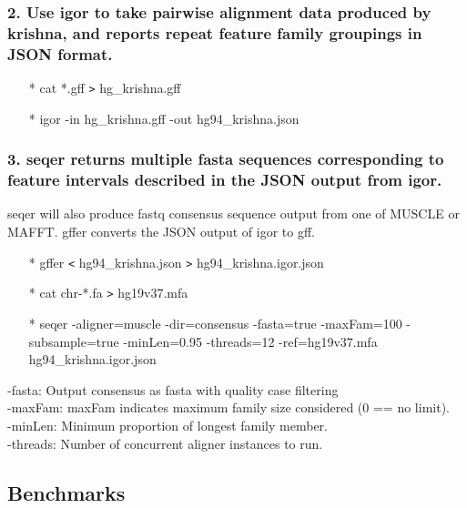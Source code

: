 \documentclass[12pt]{report}
\begin{document}
\subsubsection{2. Use igor to take pairwise alignment data produced by krishna, and reports repeat feature family groupings in JSON format.}

\begin{enumerate}
	\item[*] cat *.gff \texttt{>} hg\_krishna.gff
	\item[*] igor -in hg\_krishna.gff -out hg94\_krishna.json
\end{enumerate}

\subsubsection{3. seqer returns multiple fasta sequences corresponding to feature intervals described in the JSON output from igor.}
seqer will also produce fastq consensus sequence output from one of MUSCLE or MAFFT. gffer converts the JSON output of igor to gff.

\begin{enumerate}
	\item[*] gffer \texttt{<} hg94\_krishna.json \texttt{>} hg94\_krishna.igor.json
	\item[*] cat chr-*.fa \texttt{>} hg19v37.mfa
	\item[*] seqer -aligner=muscle -dir=consensus -fasta=true -maxFam=100 -subsample=true -minLen=0.95 -threads=12 -ref=hg19v37.mfa hg94\_krishna.igor.json
\end{enumerate}

-fasta: Output consensus as fasta with quality case filtering\\
-maxFam: maxFam indicates maximum family size considered (0 == no limit).\\
-minLen: Minimum proportion of longest family member.\\
-threads: Number of concurrent aligner instances to run.


\subsection*{Benchmarks}
\end{document}
